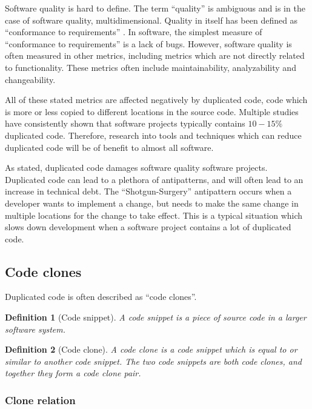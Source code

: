 \documentclass[12pt]{article}
\newtheorem{definition}{Definition}
\begin{document}
Software quality is hard to define. The term ``quality'' is ambiguous and is in the case
of software quality, multidimensional. Quality in itself has been defined as ``conformance
to requirements'' \cite[8]{crosby1980quality}. In software, the simplest measure of
``conformance to requirements'' is a lack of bugs. However, software
quality is often measured in other metrics, including metrics which are not directly
related to functionality\cite[29]{MetricsAndModelsInSoftwareQuality}. These metrics
often include maintainability, analyzability and changeability.

All of these stated metrics are affected negatively by duplicated code, code which is more
or less copied to different locations in the source code. Multiple studies have consistently
shown that software projects typically contains $10-15\%$ duplicated
code\cite{CloningByAccident}. Therefore, research into tools and techniques which can
reduce duplicated code will be of benefit to almost all software.

As stated, duplicated code damages software quality software projects. Duplicated code can
lead to a plethora of antipatterns, and will often lead to an
increase in technical debt. The ``Shotgun-Surgery''\cite[66]{fowlerrefactoring} antipattern
occurs when a developer wants to implement a change, but needs to make the same change in
multiple locations for the change to take effect. This is a typical situation which slows down
development when a software project contains a lot of duplicated code.

\subsection{Code clones}

Duplicated code is often described as ``code clones''.

\begin{definition}[Code snippet]
	A code snippet is a piece of source code in a larger software system.
\end{definition}

\begin{definition}[Code clone]
	A code clone is a code snippet which is equal to or similar to another code snippet. The two
	code snippets are both code clones, and together they form a code clone pair.
\end{definition}

\subsubsection{Clone relation}
\end{document}
